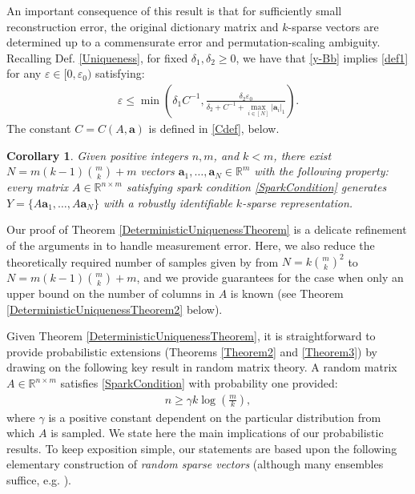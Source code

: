 \documentclass[journal, twocolumn]{IEEEtran}
\newtheorem{corollary}{Corollary}
\begin{document}

An important consequence of this result is that for sufficiently small reconstruction error, the original dictionary matrix and $k$-sparse vectors are determined up to a commensurate error and permutation-scaling ambiguity. Recalling Def. \ref{Uniqueness}, for fixed $\delta_1, \delta_2 \geq 0$, we have that \eqref{y-Bb} implies \eqref{def1} for any $\varepsilon \in [0, \varepsilon_0)$ satisfying:
\begin{align}\label{epsd1d2}
\varepsilon \leq \min \left( \delta_1 C^{-1}, \frac{ \delta_2 \varepsilon_0}{\delta_2 + C^{-1} + \max_{i \in [N]} |\mathbf{a}_i|_1} \right).
\end{align}
The constant $C = C(A, \mathbf{a})$ is defined in \eqref{Cdef}, below. 

\begin{corollary}\label{DeterministicUniquenessCorollary}
Given positive integers $n, m$, and $k < m$, there exist $N =  m(k-1){m \choose k}+m$ vectors $\mathbf{a}_1, \ldots, \mathbf{a}_N \in \mathbb{R}^m$ with the following property: every matrix $A \in \mathbb{R}^{n \times m}$ satisfying spark condition \eqref{SparkCondition} generates $Y = \{A\mathbf{a}_1, \ldots, A\mathbf{a}_N\}$ with a robustly identifiable $k$-sparse representation.
\end{corollary}

Our proof of Theorem \ref{DeterministicUniquenessTheorem} is a delicate refinement of the arguments in \cite{Hillar15} to handle measurement error.  Here, we also reduce the theoretically required number of samples given by \cite{Hillar15} from $N=k{m \choose k}^2$ to $N = m(k-1){m \choose k}+m$, and we provide guarantees for the case when only an upper bound on the number of columns in $A$ is known (see Theorem \ref{DeterministicUniquenessTheorem2} below). 

Given Theorem \ref{DeterministicUniquenessTheorem}, it is straightforward to provide probabilistic extensions (Theorems \ref{Theorem2} and \ref{Theorem3}) by drawing on the following key result in random matrix theory. A random matrix $A \in \mathbb{R}^{n \times m}$ satisfies \eqref{SparkCondition} with probability one 
provided:
\begin{align}\label{CScondition}
n \geq \gamma k\log\left(\frac{m}{k}\right),
\end{align}
where $\gamma$ is a positive constant dependent on the particular distribution from which $A$ is sampled. \cite{??} We state here the main implications of our probabilistic results. To keep exposition simple, our statements are based upon the following elementary construction of \emph{random sparse vectors} (although many ensembles suffice, e.g. \cite[Sec.~\S 4]{Baraniuk08}).
\end{document}
